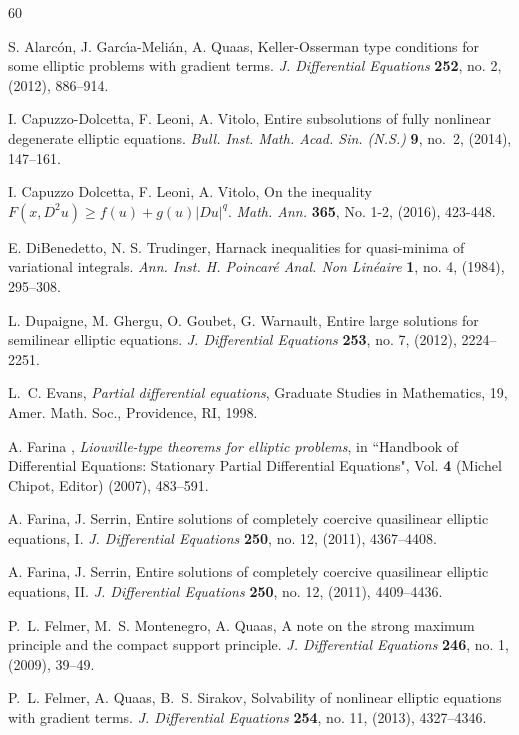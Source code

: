 \documentclass[12pt,a4paper]{amsart}
\numberwithin{equation}{section} %
\theoremstyle{definition}
\theoremstyle{remark}
\begin{document}
\begin{thebibliography}{60}

 {\sc S. Alarc\'on, J. Garc\'{\i}a-Meli\'an, A. Quaas}, 
{ Keller-Osserman type conditions for some elliptic problems with gradient terms}. 
{\em J. Differential Equations} {\bf 252},  no. 2, (2012), 886--914.

 {\sc I. Capuzzo-Dolcetta, F. Leoni, A. Vitolo}, 
{Entire subsolutions of fully nonlinear degenerate elliptic equations}. 
{\em Bull. Inst. Math. Acad. Sin. (N.S.)} {\bf 9}, no.~2, (2014), 147--161.

 {\sc I. Capuzzo Dolcetta, F. Leoni, A. Vitolo}, 
{On the inequality $F(x,D^2u)\geq f(u)+g(u)|Du|^q$}. 
{\em Math. Ann.} {\bf 365}, No. 1-2, (2016), 423-448.

 {\sc E. DiBenedetto, N. S. Trudinger}, 
{ Harnack inequalities for quasi-minima of variational integrals}. 
{\em Ann. Inst. H. Poincar\'e Anal. Non Lin\'eaire} {\bf 1}, no. 4, (1984), 295--308.
    
 {\sc L. Dupaigne, M. Ghergu, O. Goubet, G. Warnault}, 
{Entire large solutions for semilinear elliptic equations}. 
{\em J. Differential Equations} {\bf 253}, no. 7, (2012), 2224--2251.
    
 L.~C. Evans, {\it Partial differential equations}, Graduate Studies in Mathematics, 19, Amer. Math. Soc., Providence, RI, 1998.    
    
 {\sc A. Farina }, 
{\em  Liouville-type theorems for elliptic problems}, 
in ``Handbook of
Differential Equations: Stationary Partial Differential
Equations", Vol. {\bf 4} (Michel Chipot, Editor) (2007), 483--591.

 {\sc A. Farina, J. Serrin}, 
{Entire solutions of completely coercive quasilinear elliptic equations, I}. 
{\em J. Differential Equations} {\bf 250}, no. 12, (2011), 4367--4408.

 {\sc A. Farina, J. Serrin}, 
{Entire solutions of completely coercive quasilinear elliptic equations, II}. 
{\em J. Differential Equations} {\bf 250}, no. 12, (2011), 4409--4436.

 {\sc P.~L. Felmer, M.~S. Montenegro, A. Quaas}, 
{ A note on the strong maximum principle and the compact support principle}. 
{\em J. Differential Equations} {\bf 246}, no. 1, (2009), 39--49.

 {\sc P.~L. Felmer, A. Quaas, B.~S. Sirakov}, 
{ Solvability of nonlinear elliptic equations with gradient terms}. 
{\em J. Differential Equations} {\bf 254}, no. 11, (2013), 4327--4346.
    

\end{thebibliography}
\end{document}
